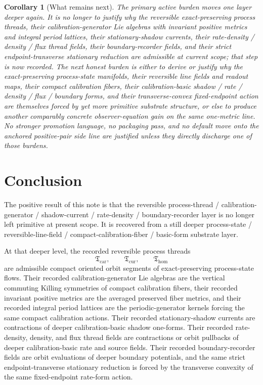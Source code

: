 \documentclass[11pt]{article}
\newcommand{\TensorThreadClass}{\mathfrak T_{\mathrm{car}}}
\newcommand{\CurThreadClass}{\mathfrak T_{\mathrm{cur}}}
\newcommand{\HomThreadClass}{\mathfrak T_{\mathrm{hom}}}
\newtheorem{corollary}{Corollary}
\begin{document}
\begin{corollary}[What remains next]
\label{cor:what_next}
The primary active burden moves one layer deeper again. It is no longer to justify why the reversible exact-preserving process threads, their calibration-generator Lie algebras with invariant positive metrics and integral period lattices, their stationary-shadow currents, their rate-density / density / flux thread fields, their boundary-recorder fields, and their strict endpoint-transverse stationary reduction are admissible at current scope; that step is now recorded. The next honest burden is either to derive or justify why the exact-preserving process-state manifolds, their reversible line fields and readout maps, their compact calibration fibers, their calibration-basic shadow / rate / density / flux / boundary forms, and their transverse-convex fixed-endpoint action are themselves forced by yet more primitive substrate structure, or else to produce another comparably concrete observer-equation gain on the same one-metric line. No stronger promotion language, no packaging pass, and no default move onto the anchored positive-pair side line are justified unless they directly discharge one of those burdens.
\end{corollary}

\section{Conclusion}

The positive result of this note is that the reversible process-thread / calibration-generator / shadow-current / rate-density / boundary-recorder layer is no longer left primitive at present scope. It is recovered from a still deeper process-state / reversible-line-field / compact-calibration-fiber / basic-form substrate layer.

At that deeper level, the recorded reversible process threads
\[
\TensorThreadClass,\qquad
\CurThreadClass,\qquad
\HomThreadClass
\]
are admissible compact oriented orbit segments of exact-preserving process-state flows. Their recorded calibration-generator Lie algebras are the vertical commuting Killing symmetries of compact calibration fibers, their recorded invariant positive metrics are the averaged preserved fiber metrics, and their recorded integral period lattices are the periodic-generator kernels forcing the same compact calibration actions. Their recorded stationary-shadow currents are contractions of deeper calibration-basic shadow one-forms. Their recorded rate-density, density, and flux thread fields are contractions or orbit pullbacks of deeper calibration-basic rate and source fields. Their recorded boundary-recorder fields are orbit evaluations of deeper boundary potentials, and the same strict endpoint-transverse stationary reduction is forced by the transverse convexity of the same fixed-endpoint rate-form action.
\end{document}
